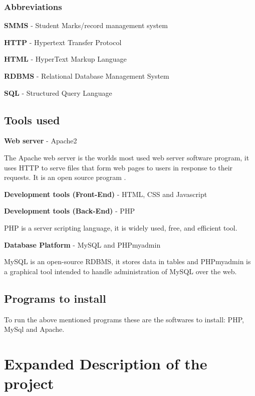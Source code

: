 \documentclass[10pt,onecolumn]{RequimentsGathering}
\begin{document}
\subsubsection{Abbreviations}

\textbf{SMMS} - Student Marks/record management system

\textbf{HTTP} - Hypertext Transfer Protocol

\textbf{HTML} - HyperText Markup Language

\textbf{RDBMS} - Relational Database Management System

\textbf{SQL} - Structured Query Language

%
\subsection{Tools used}
\textbf{Web server} - Apache2

The Apache web server is the worlds most used web server software program, it uses HTTP to serve files that form web pages to users in response to their requests. It is an open source program \cite{ref5, ref6}. 

\textbf{Development tools (Front-End)} - HTML, CSS and Javascript

\textbf{Development tools (Back-End)} - PHP 

PHP is a server scripting language, it is widely used, free, and efficient tool.

\textbf{Database Platform} - MySQL and PHPmyadmin 

MySQL is an open-source RDBMS, it stores data in tables and PHPmyadmin is a graphical tool intended to handle administration of MySQL over the web.   

\subsection{Programs to install}

To run the above mentioned programs these are the softwares to install: PHP, MySql and Apache.
\section{Expanded Description of the project}
\end{document}
